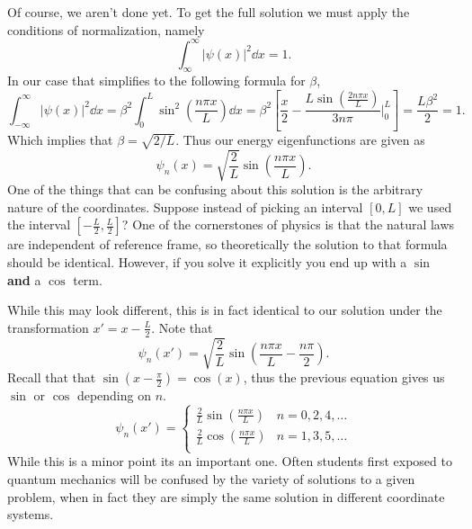 \documentclass[10pt]{article}
\begin{document}
Of course, we aren't done yet. To get the full solution we must apply the conditions of normalization, namely 
\[
  \int_{\infty}^\infty |\psi(x)|^2 \dd{x} = 1.
\]
In our case that simplifies to the following formula for $\beta$,
\[
  \int_{-\infty}^\infty |\psi(x)|^2 \dd{x} 
  = \beta^2 \int_{0}^L \sin^2(\frac{n\pi x}{L}) \dd{x} 
  = \beta^2 \left [ \frac{x}{2} - \frac{L\sin(\frac{2n\pi x}{L})}{3n\pi} \Bigg|_0^L \right]
  = \frac{L\beta^2}{2} = 1.
\]
Which implies that $\beta = \sqrt{2/L}$. Thus our energy eigenfunctions are given as 
\[
  \psi_n(x) = \sqrt{\frac{2}{L}}\sin(\frac{n\pi x}{L}).
\]
One of the things that can be confusing about this solution is the arbitrary nature of the coordinates. Suppose instead of picking an interval $[0, L]$ we used the interval $[-\frac{L}{2}, \frac{L}{2}]$? One of the cornerstones of physics is that the natural laws are independent of reference frame, so theoretically the solution to that formula should be identical. However, if you solve it explicitly you end up with a $\sin$ \textbf{and} a $\cos$ term. 

While this may look different, this is in fact identical to our solution under the transformation $x' = x - \frac{L}{2}$. Note that 
\[
  \psi_n(x') = \sqrt{\frac{2}{L}} \sin(\frac{n \pi x}{L} - \frac{n \pi}{2}).
\] 
Recall that that $\sin(x - \frac{\pi}{2}) = \cos(x)$, thus the previous equation gives us $\sin$ or $\cos$ depending on $n$.
\[
  \psi_n(x') = \begin{cases}
    \frac{2}{L} \sin(\frac{n\pi x}{L}) & n = 0, 2, 4, \dots \\
    \frac{2}{L} \cos(\frac{n\pi x}{L}) & n = 1, 3, 5, \dots \\
  \end{cases}
\] 
While this is a minor point its an important one. Often students first exposed to quantum mechanics will be confused by the variety of solutions to a given problem, when in fact they are simply the same solution in different coordinate systems.
\end{document}
